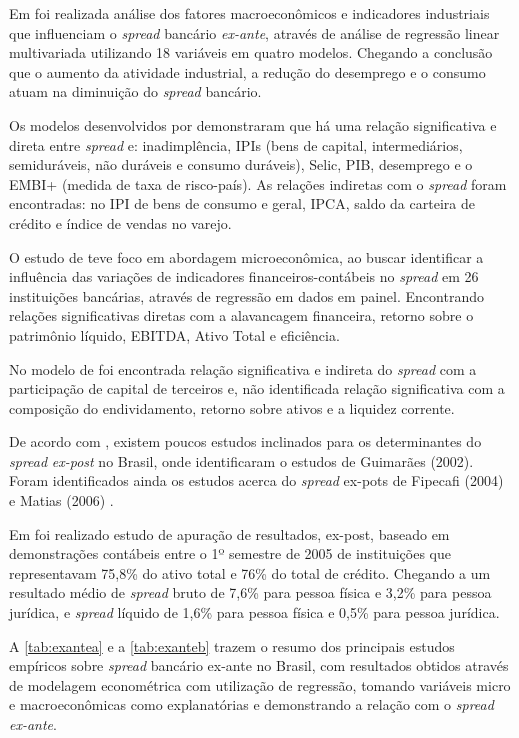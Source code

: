 \documentclass[12pt,12pt,openright,oneside,a4paper,chapter=TITLE,section=TITLE,subsection=TITLE,subsubsection=TITLE,english,french,spanish,portugues,sumario=tradicional]{abntex2}
\begin{document}
Em \textcite{durigan:2018} foi realizada análise dos fatores macroeconômicos e
indicadores industriais que influenciam o \emph{spread} bancário \emph{ex-ante}, através de análise de regressão linear multivariada utilizando 18 variáveis em quatro
modelos. Chegando a conclusão que o aumento da atividade industrial, a redução
do desemprego e o consumo atuam na diminuição do \emph{spread} bancário.

Os modelos desenvolvidos por \textcite{durigan:2018} demonstraram que há uma
relação significativa e direta entre \emph{spread} e: inadimplência, IPIs (bens de
capital, intermediários, semiduráveis, não duráveis e consumo duráveis), Selic,
PIB, desemprego e o EMBI+ (medida de taxa de risco-país). As relações indiretas
com o \emph{spread} foram encontradas: no IPI de bens de consumo e geral, IPCA,
saldo da carteira de crédito e índice de vendas no varejo.

O estudo de \textcite{timotio:2018} teve foco em abordagem microeconômica, ao
buscar identificar a influência das variações de indicadores
financeiros-contábeis no \emph{spread} em 26 instituições bancárias,
através de regressão em dados em painel. Encontrando relações significativas
diretas com a alavancagem financeira, retorno sobre o patrimônio líquido,
EBITDA, Ativo Total e eficiência.

No modelo de \textcite{timotio:2018} foi encontrada relação significativa e
indireta do \emph{spread} com a participação de capital de terceiros e, não
identificada relação significativa com a composição do endividamento, retorno
sobre ativos e a liquidez corrente.

De acordo com \textcite{durigan:2018, dantas:2012}, existem poucos estudos
inclinados para os determinantes do \emph{spread} \emph{ex-post} no Brasil, onde
identificaram o estudos de Guimarães (2002). Foram identificados ainda os
estudos acerca do \emph{spread} ex-pots de Fipecafi (2004) \cite{dantas:2012} e Matias (2006) \cite{leal:2006}.

Em \textcite{fipecafi:2005} foi realizado estudo de apuração de resultados,
ex-post, baseado em demonstrações contábeis entre o 1º semestre de 2005 de
instituições que representavam 75,8\% do ativo total e 76\% do total de crédito.
Chegando a um resultado médio de \emph{spread} bruto de 7,6\% para pessoa física e
3,2\% para pessoa jurídica, e \emph{spread} líquido de 1,6\% para pessoa física e 0,5\%
para pessoa jurídica.

A \autoref{tab:exantea} e a \autoref{tab:exanteb} trazem o resumo dos
principais estudos empíricos sobre \emph{spread} bancário ex-ante no Brasil, com
resultados obtidos através de modelagem econométrica com utilização de
regressão, tomando variáveis micro e macroeconômicas como explanatórias e
demonstrando a relação com o \emph{spread ex-ante}.
\end{document}
